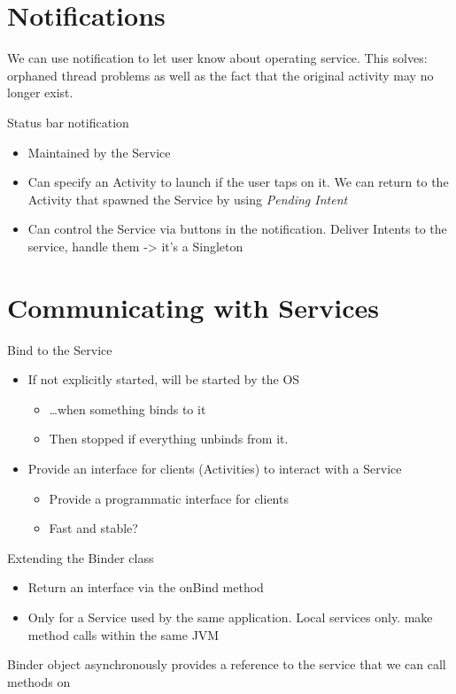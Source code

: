 \documentclass{article}
\begin{document}
\section{Notifications}

\begin{flushleft}
We can use notification to let user know about operating service. This solves: orphaned thread problems as well as the fact that the original activity may no longer exist.
\end{flushleft}
Status bar notification
\begin{itemize}
  \item Maintained by the Service
  \item Can specify an Activity to launch if the user taps on it. We can return to the Activity that spawned the Service by using \textit{Pending Intent}
  \item Can	control	the	Service	via	buttons	in	the	notification. Deliver Intents to the service, handle them -> it’s a Singleton
\end{itemize}

\section{Communicating	with	Services}
\begin{flushleft}
Bind to the Service
\begin{itemize}
  \item If not explicitly started, will be started by the OS  
  \begin{itemize}
    \item  …when something binds to it 
    \item Then stopped if everything unbinds from it.
  \end{itemize}
  \item  Provide an interface for clients (Activities) to interact with a Service
  \begin{itemize}  
    \item Provide a programmatic interface for clients
    \item Fast and stable?  
  \end{itemize}
\end{itemize}
Extending the Binder class
\begin{itemize}
  \item Return an interface via the onBind method
  \item Only for a Service used by the same application. Local services only. make method calls within the same JVM
\end{itemize}
Binder object asynchronously provides a reference to the service that we can call methods on
\end{flushleft}
\end{document}
